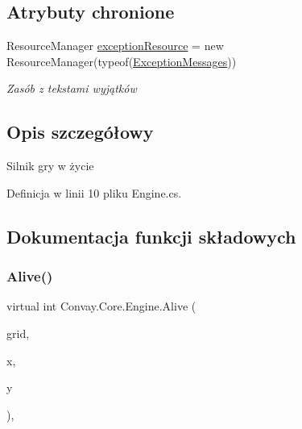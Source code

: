 \subsection*{Atrybuty chronione}
\begin{DoxyCompactItemize}
\item 
Resource\+Manager \hyperlink{class_convay_1_1_core_1_1_engine_a42e18f3b5a92a0de8957dc23010ca822}{exception\+Resource} = new Resource\+Manager(typeof(\hyperlink{class_convay_1_1_core_1_1_exception_messages}{Exception\+Messages}))
\begin{DoxyCompactList}\small\item\em Zasób z tekstami wyjątków \end{DoxyCompactList}\end{DoxyCompactItemize}


\subsection{Opis szczegółowy}
Silnik gry w życie 



Definicja w linii 10 pliku Engine.\+cs.



\subsection{Dokumentacja funkcji składowych}
\hypertarget{class_convay_1_1_core_1_1_engine_a0d8721d8809a865703b4abb38987f487}{}\label{class_convay_1_1_core_1_1_engine_a0d8721d8809a865703b4abb38987f487} 
\subsubsection{\texorpdfstring{Alive()}{Alive()}}
{\footnotesize\ttfamily virtual int Convay.\+Core.\+Engine.\+Alive (\begin{DoxyParamCaption}\item[{\hyperlink{interface_convay_1_1_core_1_1_interfaces_1_1_i_grid}{I\+Grid}}]{grid,  }\item[{int}]{x,  }\item[{int}]{y }\end{DoxyParamCaption})\hspace{0.3cm}{\ttfamily [protected]}, {\ttfamily [virtual]}}



